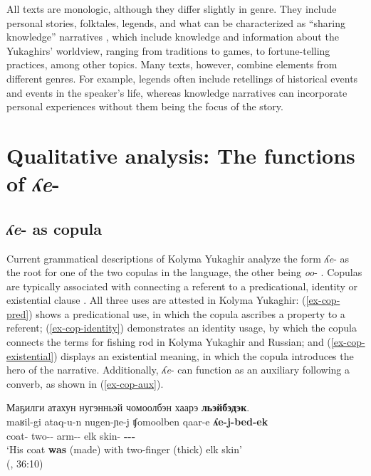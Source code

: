 \documentclass[output=paper,colorlinks,citecolor=brown
\ChapterDOI{10.5281/zenodo.15697581}
]{langscibook}
\begin{document}
All texts are monologic, although they differ slightly in genre. 
They include personal stories, folktales, legends, and what can be characterized as ``sharing knowledge'' narratives \citep{Smith1999}, which include knowledge and information about the Yukaghirs' worldview, ranging from traditions to games, to fortune-telling practices, among other topics.  
Many texts, however, combine elements from different genres. 
For example, legends often include retellings of historical events and events in the speaker's life, whereas knowledge narratives can incorporate personal experiences without them being the focus of the story. 


\section{Qualitative analysis: The functions of \textit{ʎe}-} \label{sec_qual}

\subsection{\textit{ʎe}- as copula}
Current grammatical descriptions of Kolyma Yukaghir analyze the form \textit{ʎe}- as the root for one of the two copulas in the language, the other being \textit{oo}- \citep{Krejnovich1982, Maslova2003, Nikolaeva2006, Nagasaki2010}.
Copulas are typically associated with connecting a referent to a predicational, identity or existential clause \citep{Citko2014}.
All three uses are attested in Kolyma Yukaghir: (\ref{ex-cop-pred}) shows a predicational use, in which the copula ascribes a property to a referent; (\ref{ex-cop-identity}) demonstrates an identity usage, by which the copula connects the terms for fishing rod in Kolyma Yukaghir and Russian; and (\ref{ex-cop-existential}) displays an existential meaning, in which the copula introduces the hero of the narrative.
Additionally, \textit{ʎe}- can function as an auxiliary following a converb, as shown in (\ref{ex-cop-aux}). 

\ea \label{ex-cop-pred}
    \glll Маҕилги атахун нугэнньэй чомоолбэн хаарэ \textbf{льэйбэдэк}. \\
    maʁil-gi ataq-u-n nugen-ɲe-j ʧomoolben qaar-e \textbf{ʎe-j-bed-ek}  \\
    coat-\Third\Poss{} two-\Ep-\Lnk{} arm-\Prop-\Ptcp{} elk skin-\Ins{} \textbf{\Cop-\Ptcp-\Nmlz-\Pred{}} \\
    \glt `His coat \textbf{was} (made) with two-finger (thick) elk skin' \\
     \hfill (\citealt{Nikolaeva_Mayer2004}, 36:10)
\z
\end{document}
